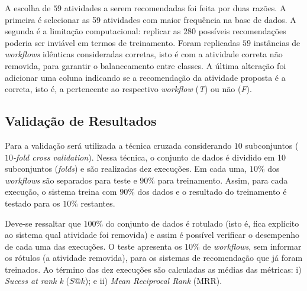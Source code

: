 \documentclass[10pt,letterpaper]{article}
\begin{document}
A escolha de \(59\) atividades a serem recomendadas foi feita por duas razões. A primeira é selecionar as 59 atividades com maior frequência na base de dados. A segunda é a limitação computacional: replicar as \(280\) possíveis recomendações poderia ser inviável em termos de treinamento. Foram replicadas \(59\) instâncias de \emph{workflows} idênticas consideradas corretas, isto é com a atividade correta não removida, para garantir o balanceamento entre classes. A última alteração foi adicionar uma coluna indicando se a recomendação da atividade proposta é a correta, isto é, a pertencente ao respectivo \emph{workflow} (\emph{T}) ou não (\emph{F}).

\subsection*{Validação de Resultados}
Para a validação será utilizada a técnica cruzada considerando \(10\) subconjuntos (\emph{\(10\)-fold cross validation}). Nessa técnica, o conjunto de dados é dividido em 10 subconjuntos (\emph{folds}) e são realizadas dez execuções. Em cada uma, \(10\%\) dos \emph{workflows} são separados para teste e \(90\%\) para treinamento. Assim, para cada execução, o sistema treina com \(90\%\) dos dados e o resultado do treinamento é testado para os \(10\%\) restantes. 

Deve-se ressaltar que \(100\%\) do conjunto de dados é rotulado (isto é, fica explícito ao sistema qual atividade foi removida) e assim é possível verificar o desempenho de cada uma das execuções. O teste apresenta os \(10\%\) de \emph{workflows}, sem informar os rótulos (a atividade removida), para os sistemas de recomendação que já foram treinados. Ao término das dez execuções são calculadas as médias das métricas: i) \emph{Sucess at rank k} (\(S@k\)); e ii) \emph{Mean Reciprocal Rank} (MRR). %
\end{document}
